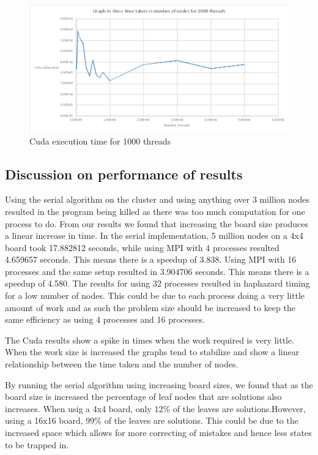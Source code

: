 \documentclass[a4paper]{article}
\begin{document}
\begin{figure}[H]
	\centering
	\includegraphics[width=1.0\textwidth,scale=1.0]{images/cuda_1000threads}
	\caption{Cuda execution time for 1000 threads}
\end{figure}


\subsection{Discussion on performance of results}
Using the serial algorithm on the cluster and using anything over 3 million nodes resulted in the program being killed as there was too much computation for one process to do. From our results we found that increasing the board size produces a linear increase in time. In the serial implementation, 5 million nodes on a 4x4 board took 17.882812 seconds, while using MPI with 4 processes resulted 4.659657 seconds. This means there is a speedup of 3.838. Using MPI with 16 processes and the same setup resulted in 3.904706 seconds. This means there is a speedup of 4.580.
The results for using 32 processes resulted in haphazard timing for a low number of nodes. This could be due to each process doing a very little amount of work and as such the problem size should be increased to keep the same efficiency as using 4 processes and 16 processes. 

The Cuda results show a spike in times when the work required is very little. When the work size is increased the graphs tend to stabilize and show a linear relationship between the time taken and the number of nodes.

\noindent By running the serial algorithm using increasing board sizes, we found that as the board size is increased the percentage of leaf nodes that are solutions also increases. When usig a 4x4 board, only 12\% of the leaves are solutions.However, using a 16x16 board, 99\% of the leaves are solutions. This could be due to the increased space which allows for more correcting of mistakes and hence less states to be trapped in.
\end{document}
